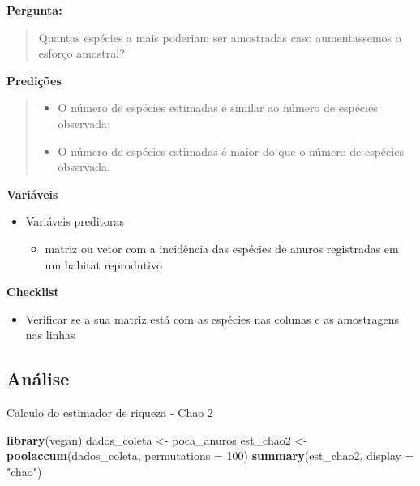 \documentclass[
]{book}
\newenvironment{Shaded}{\begin{snugshade}}{\end{snugshade}}
\newcommand{\DataTypeTok}[1]{\textcolor[rgb]{0.13,0.29,0.53}{#1}}
\newcommand{\DecValTok}[1]{\textcolor[rgb]{0.00,0.00,0.81}{#1}}
\newcommand{\KeywordTok}[1]{\textcolor[rgb]{0.13,0.29,0.53}{\textbf{#1}}}
\newcommand{\NormalTok}[1]{#1}
\newcommand{\StringTok}[1]{\textcolor[rgb]{0.31,0.60,0.02}{#1}}
\providecommand{\tightlist}{%
  \setlength{\itemsep}{0pt}\setlength{\parskip}{0pt}}
\begin{document}
\textbf{Pergunta:}

\begin{quote}
Quantas espécies a mais poderiam ser amostradas caso aumentassemos o esforço amostral?
\end{quote}

\textbf{Predições}

\begin{quote}
\begin{itemize}
\tightlist
\item
  O número de espécies estimadas é similar ao número de espécies observada;
\item
  O número de espécies estimadas é maior do que o número de espécies observada.
\end{itemize}
\end{quote}

\textbf{Variáveis}

\begin{itemize}
\tightlist
\item
  Variáveis preditoras

  \begin{itemize}
  \tightlist
  \item
    matriz ou vetor com a incidência das espécies de anuros registradas em um habitat reprodutivo
  \end{itemize}
\end{itemize}

\textbf{Checklist}

\begin{itemize}
\tightlist
\item
  Verificar se a sua matriz está com as espécies nas colunas e as amostragens nas linhas
\end{itemize}

\hypertarget{anuxe1lise-2}{%
\subsection{Análise}\label{anuxe1lise-2}}

Calculo do estimador de riqueza - Chao 2

\begin{Shaded}
\begin{Highlighting}[]
\KeywordTok{library}\NormalTok{(vegan)}
\NormalTok{dados_coleta <-}\StringTok{ }\NormalTok{poca_anuros}
\NormalTok{est_chao2 <-}\StringTok{ }\KeywordTok{poolaccum}\NormalTok{(dados_coleta, }\DataTypeTok{permutations =} \DecValTok{100}\NormalTok{)}
\KeywordTok{summary}\NormalTok{(est_chao2, }\DataTypeTok{display =} \StringTok{"chao"}\NormalTok{)}
\end{Highlighting}
\end{Shaded}
\end{document}
